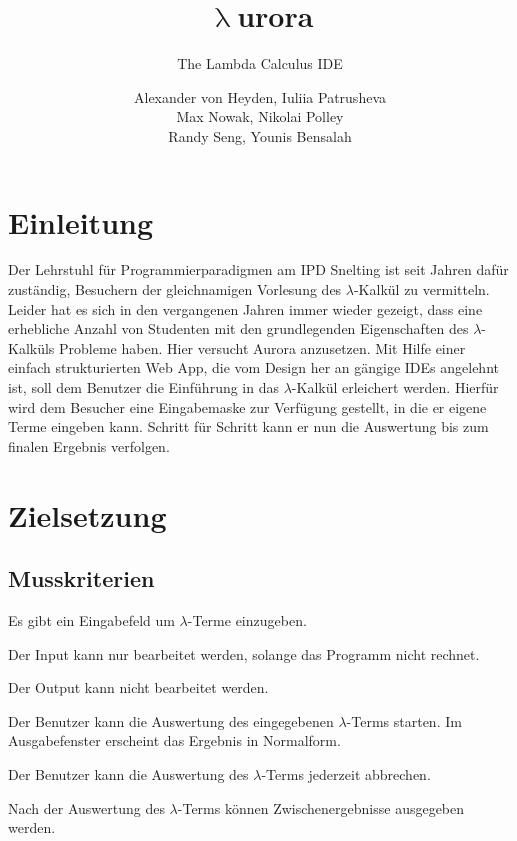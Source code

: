 \documentclass[parskip=full,11pt,twoside]{scrartcl}
\title{\textbf{$\uplambda$}urora}
\subtitle{The Lambda Calculus IDE}
\author{Alexander von Heyden, Iuliia Patrusheva\\
 Max Nowak, Nikolai Polley\\
 Randy Seng, Younis Bensalah}
\begin{document}
\maketitle
\newpage
\tableofcontents

\newpage
\section{Einleitung}
Der Lehrstuhl für Programmierparadigmen am IPD Snelting ist seit Jahren dafür zuständig, Besuchern der gleichnamigen Vorlesung des $\lambda$-Kalkül zu vermitteln. Leider hat es sich in den vergangenen Jahren immer wieder gezeigt, dass eine erhebliche Anzahl von Studenten mit den grundlegenden Eigenschaften des $\lambda$-Kalküls Probleme haben. Hier versucht Aurora anzusetzen. Mit Hilfe einer einfach strukturierten Web App, die vom Design her an gängige IDEs angelehnt ist, soll dem Benutzer die Einführung in das $\lambda$-Kalkül erleichert werden. Hierfür wird dem Besucher eine Eingabemaske zur Verfügung gestellt, in die er eigene Terme eingeben kann. Schritt für Schritt kann er nun die Auswertung bis zum finalen Ergebnis verfolgen.


\newpage
\section{Zielsetzung}

\subsection{Musskriterien}

Es gibt ein Eingabefeld um $\lambda$-Terme einzugeben.

Der Input kann nur bearbeitet werden, solange das Programm nicht rechnet.

Der Output kann nicht bearbeitet werden.

Der Benutzer kann die Auswertung des eingegebenen $\lambda$-Terms starten. Im Ausgabefenster erscheint das Ergebnis in Normalform.

Der Benutzer kann die Auswertung des $\lambda$-Terms jederzeit abbrechen.

Nach der Auswertung des $\lambda$-Terms können Zwischenergebnisse ausgegeben werden.
\end{document}
